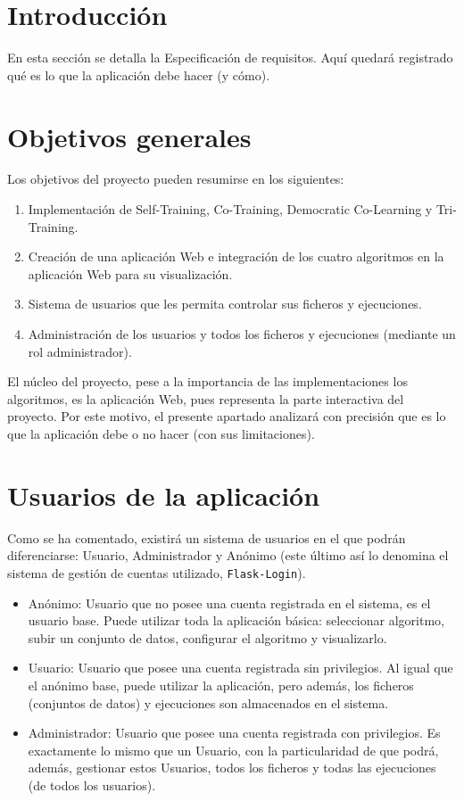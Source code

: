 
\section{Introducción}

En esta sección se detalla la Especificación de requisitos. Aquí quedará
registrado qué es lo que la aplicación debe hacer (y cómo).

\section{Objetivos generales}
Los objetivos del proyecto pueden resumirse en los siguientes:
\begin{enumerate}
    \item Implementación de Self-Training, Co-Training, Democratic Co-Learning y
    Tri-Training.
    \item Creación de una aplicación Web e integración de los cuatro algoritmos
    en la aplicación Web para su visualización.
    \item Sistema de usuarios que les permita controlar sus ficheros y
    ejecuciones.
    \item Administración de los usuarios y todos los ficheros y ejecuciones
    (mediante un rol administrador).
\end{enumerate}

El núcleo del proyecto, pese a la importancia de las implementaciones los
algoritmos, es la aplicación Web, pues representa la parte interactiva del
proyecto. Por este motivo, el presente apartado analizará con precisión que es
lo que la aplicación debe o no hacer (con sus limitaciones).

\section{Usuarios de la aplicación}

Como se ha comentado, existirá un sistema de usuarios en el que podrán
diferenciarse: Usuario, Administrador y Anónimo (este último así lo denomina el
sistema de gestión de cuentas utilizado, \texttt{Flask-Login}). 

\begin{itemize}
	\item Anónimo: Usuario que no posee una cuenta registrada en el sistema, es
	el usuario base. Puede utilizar toda la aplicación básica: seleccionar
	algoritmo, subir un conjunto de datos, configurar el algoritmo y
	visualizarlo.
	\item Usuario: Usuario que posee una cuenta registrada sin privilegios. Al
	igual que el anónimo base, puede utilizar la aplicación, pero además, los
	ficheros (conjuntos de datos) y ejecuciones son almacenados en el sistema.
	\item Administrador: Usuario que posee una cuenta registrada con
	privilegios. Es exactamente lo mismo que un Usuario, con la particularidad
	de que podrá, además, gestionar estos Usuarios, todos los ficheros y todas
	las ejecuciones (de todos los usuarios). 
\end{itemize}

